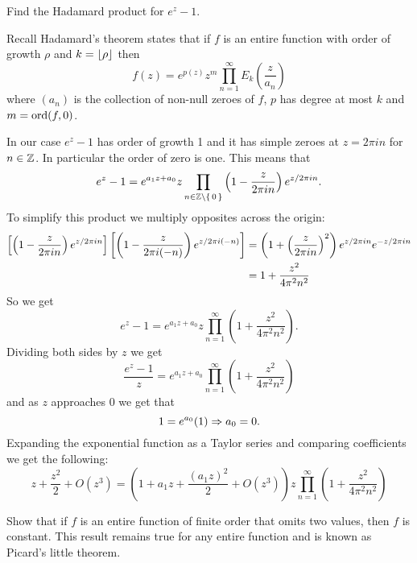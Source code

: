 \documentclass[12pt]{memoir}
\begin{document}
\begin{Ej}
   Find the Hadamard product for $e^z-1$.
\end{Ej}

\begin{ptcbr}
Recall Hadamard's theorem states that if $f$ is an entire function with order of growth $\rho$ and $k=\lfloor\rho\rfloor$ then 
$$f(z)=e^{p(z)}z^m\prod_{n=1}^{\infty}E_k\left(\frac{z}{a_n}\right)$$
where $(a_n)$ is the collection of non-null zeroes of $f$, $p$ has degree at most $k$ and $m=\operatorname{ord}(f,0)$.\par 
In our case $e^z-1$ has order of growth 1 and it has simple zeroes at $z=2\pi i n$ for $n\in\mathbb{Z}$. In particular the order of zero is one. This means that 
$$e^z-1=e^{a_1z+a_0}z\prod_{n\in\mathbb{Z}\setminus\{\,0\,\}}\left(1-\frac{z}{2\pi i n}\right)e^{z/2\pi i n}.$$
To simplify this product we multiply opposites across the origin:
\begin{align*}
\left\lbrack\left(1-\frac{z}{2\pi i n}\right)e^{z/2\pi i n}\right\rbrack\left\lbrack\left(1-\frac{z}{2\pi i (-n)}\right)e^{z/2\pi i (-n)}\right\rbrack&=\left(1+\left(\frac{z}{2\pi i n}\right)^2\right)e^{z/2\pi i n}e^{-z/2\pi i n}\\
&=1+\frac{z^2}{4\pi^2n^2}   
\end{align*}
So we get
$$e^z-1=e^{a_1z+a_0}z\prod_{n=1}^\infty\left(1+\frac{z^2}{4\pi^2n^2} \right).$$ 
Dividing both sides by $z$ we get 
$$\frac{e^z-1}{z}=e^{a_1z+a_0}\prod_{n=1}^\infty\left(1+\frac{z^2}{4\pi^2n^2} \right)$$
and as $z$ approaches $0$ we get that 
$$1=e^{a_0}(1)\Rightarrow a_0=0.$$
Expanding the exponential function as a Taylor series and comparing coefficients we get the following:
$$z+\frac{z^2}{2}+O(z^3)=(1+a_1z+\frac{(a_1z)^2}{2}+O(z^3))z\prod_{n=1}^\infty\left(1+\frac{z^2}{4\pi^2n^2} \right)$$
\end{ptcbr}

\begin{Ej}
   Show that if $f$ is an entire function of finite order that omits two values, then $f$ is constant. This result remains true for any entire function and is known as Picard's little theorem.

\end{Ej}

\begin{ptcbr}

   \end{ptcbr}
\end{document}
